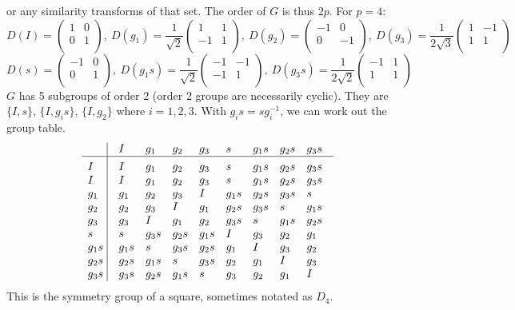\documentclass[a4paper]{article}
\begin{document}
\begin{ans}
\begin{enumerate}[label=(\alph*)]
or any similarity transforms of that set. The order of $G$ is thus $2p$. For $p=4$:
$$D(I)=\begin{pmatrix}1&0\\0&1\\\end{pmatrix},~D(g_1)=\frac{1}{\sqrt{2}}\begin{pmatrix}1&1\\-1&1\\\end{pmatrix},~D(g_2)=\begin{pmatrix}-1&0\\0&-1\\\end{pmatrix},~D(g_3)=\frac{1}{2\sqrt{3}}\begin{pmatrix}1&-1\\1&1\\\end{pmatrix}$$
$$D(s)=\begin{pmatrix}-1&0\\0&1\\\end{pmatrix},~D(g_1s)=\frac{1}{\sqrt{2}}\begin{pmatrix}-1&-1\\-1&1\\\end{pmatrix},~D(g_3s)=\frac{1}{2\sqrt{2}}\begin{pmatrix}-1&1\\1&1\\\end{pmatrix}$$
$G$ has 5 subgroups of order 2 (order 2 groups are necessarily cyclic). They are $\{I,s\}$, $\{I,g_is\}$, $\{I,g_2\}$ where $i=1,2,3$. With $g_is=sg_i^{-1}$, we can work out the group table.
$$\vbox{\tabskip0.5em\offinterlineskip
    \halign{\strut$#$\hfil\ \tabskip1em\vrule&&$#$\hfil\cr
    ~&I&g_1&g_2&g_3&s&g_1s&g_2s&g_3s   \cr
    \noalign{\hrule}\vrule height 12pt width 0pt
     I&I&g_1&g_2&g_3&s&g_1s&g_2s&g_3s    \cr
     I&I&g_1&g_2&g_3&s&g_1s&g_2s&g_3s    \cr
     g_1 & g_1 &g_2  & g_3 & I & g_1s& g_2s&g_3s&s  \cr
     g_2 & g_2 & g_3 & I & g_1&g_2s&g_3s&s&g_1s\cr
     g_3 & g_3 & I &g_1 & g_2& g_3s& s&g_1s&g_2s\cr
     s & s & g_3s& g_2s&g_1s&I&g_3&g_2&g_1 \cr
     g_1s& g_1s &s &g_3s&g_2s&g_1& I & g_3& g_2 \cr
     g_2s & g_2s& g_1s&s &g_3s& g_2& g_1 & I & g_3 \cr
     g_3s & g_3s & g_2s & g_1s & s & g_3 &g_2 & g_1 & I \cr
}}$$
This is the symmetry group of a square, sometimes notated as $D_4$.
\end{enumerate}
\end{ans}
\newpage
\end{document}
